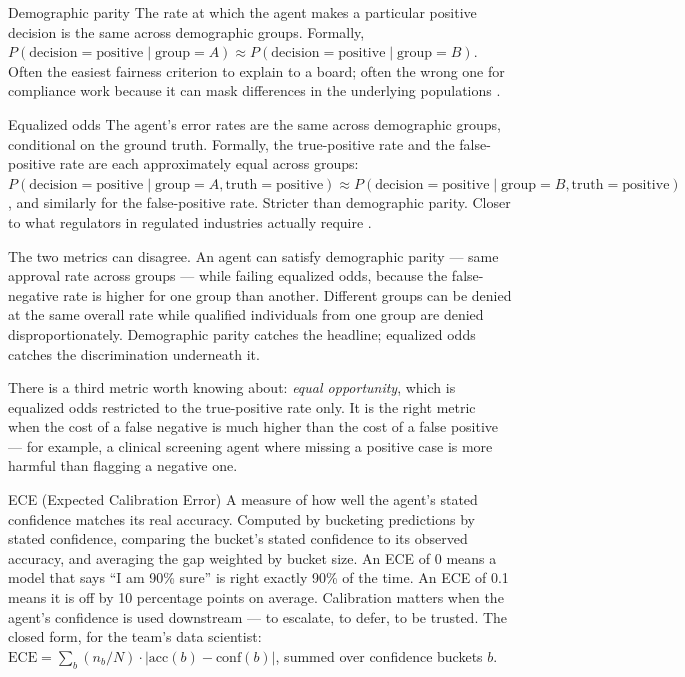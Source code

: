 \begin{TNdefinition}{Demographic parity}
The rate at which the agent makes a particular positive decision is the same across demographic groups. Formally, $P(\textrm{decision} = \textrm{positive} \mid \textrm{group} = A) \approx P(\textrm{decision} = \textrm{positive} \mid \textrm{group} = B)$. Often the easiest fairness criterion to explain to a board; often the wrong one for compliance work because it can mask differences in the underlying populations \citep{hardt2016fairness}.
\end{TNdefinition}

\begin{TNdefinition}{Equalized odds}
The agent's error rates are the same across demographic groups, conditional on the ground truth. Formally, the true-positive rate and the false-positive rate are each approximately equal across groups: $P(\textrm{decision} = \textrm{positive} \mid \textrm{group} = A, \textrm{truth} = \textrm{positive}) \approx P(\textrm{decision} = \textrm{positive} \mid \textrm{group} = B, \textrm{truth} = \textrm{positive})$, and similarly for the false-positive rate. Stricter than demographic parity. Closer to what regulators in regulated industries actually require \citep{hardt2016fairness, raji2020closing}.
\end{TNdefinition}

The two metrics can disagree. An agent can satisfy demographic parity --- same approval rate across groups --- while failing equalized odds, because the false-negative rate is higher for one group than another. Different groups can be denied at the same overall rate while qualified individuals from one group are denied disproportionately. Demographic parity catches the headline; equalized odds catches the discrimination underneath it.

There is a third metric worth knowing about: \textit{equal opportunity}, which is equalized odds restricted to the true-positive rate only. It is the right metric when the cost of a false negative is much higher than the cost of a false positive --- for example, a clinical screening agent where missing a positive case is more harmful than flagging a negative one.

\begin{TNdefinition}{ECE (Expected Calibration Error)}
A measure of how well the agent's stated confidence matches its real accuracy. Computed by bucketing predictions by stated confidence, comparing the bucket's stated confidence to its observed accuracy, and averaging the gap weighted by bucket size. An ECE of 0 means a model that says ``I am 90\% sure'' is right exactly 90\% of the time. An ECE of 0.1 means it is off by 10 percentage points on average. Calibration matters when the agent's confidence is used downstream --- to escalate, to defer, to be trusted. The closed form, for the team's data scientist: $\textrm{ECE} = \sum_b (n_b / N) \cdot |\textrm{acc}(b) - \textrm{conf}(b)|$, summed over confidence buckets $b$.
\end{TNdefinition}

